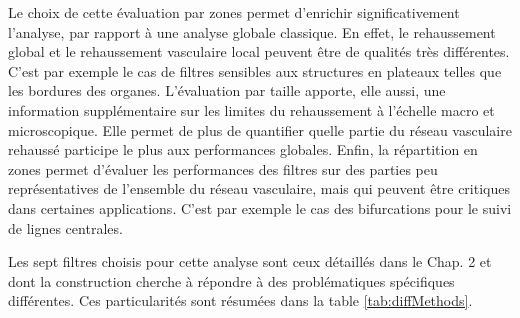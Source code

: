 Le choix de cette évaluation par zones permet d'enrichir significativement l'analyse, par rapport à une analyse globale classique. En effet, le rehaussement global et le rehaussement vasculaire local peuvent être de qualités très différentes. C'est par exemple le cas de filtres sensibles aux structures en plateaux telles que les bordures des organes. L'évaluation par taille apporte, elle aussi, une information supplémentaire sur les limites du rehaussement à l'échelle macro et microscopique. Elle permet de plus de quantifier quelle partie du réseau vasculaire rehaussé participe le plus aux performances globales. Enfin, la répartition en zones permet d'évaluer les performances des filtres sur des parties peu représentatives de l'ensemble du réseau vasculaire, mais qui peuvent être critiques dans certaines applications. C'est par exemple le cas des bifurcations pour le suivi de lignes centrales.

Les sept filtres choisis pour cette analyse sont ceux détaillés dans le Chap. 2 et dont la construction cherche à répondre à des problématiques spécifiques différentes. Ces particularités sont résumées dans la table \ref{tab:diffMethods}. 

\begin{table}[ht]
  \begin{center}
\end{center}
\caption{Liste des filtres disponibles dans le banc de test ainsi que leur principale caractéristique.}
\label{tab:diffMethods}
\end{table}

